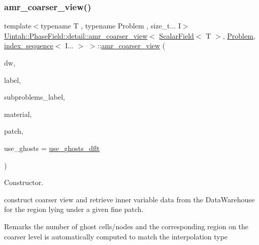 \subsubsection{\texorpdfstring{amr\+\_\+coarser\+\_\+view()}{amr\_coarser\_view()}\hspace{0.1cm}{\footnotesize\ttfamily [3/4]}}
{\footnotesize\ttfamily template$<$typename T , typename Problem , size\+\_\+t... I$>$ \\
\hyperlink{classUintah_1_1PhaseField_1_1detail_1_1amr__coarser__view}{Uintah\+::\+Phase\+Field\+::detail\+::amr\+\_\+coarser\+\_\+view}$<$ \hyperlink{structUintah_1_1PhaseField_1_1ScalarField}{Scalar\+Field}$<$ T $>$, \hyperlink{classUintah_1_1PhaseField_1_1Problem}{Problem}, \hyperlink{namespaceUintah_1_1PhaseField_a237de804d99512e50613aff7c94a9461}{index\+\_\+sequence}$<$ I... $>$ $>$\+::\hyperlink{classUintah_1_1PhaseField_1_1detail_1_1amr__coarser__view}{amr\+\_\+coarser\+\_\+view} (\begin{DoxyParamCaption}\item[{Data\+Warehouse $\ast$}]{dw,  }\item[{const Var\+Label $\ast$}]{label,  }\item[{const Var\+Label $\ast$}]{subproblems\+\_\+label,  }\item[{int}]{material,  }\item[{const Patch $\ast$}]{patch,  }\item[{bool}]{use\+\_\+ghosts = {\ttfamily \hyperlink{classUintah_1_1PhaseField_1_1detail_1_1amr__coarser__view_3_01ScalarField_3_01T_01_4_00_01Proble9cadea116dab5bdb44bb3e29abbe99ef_ace77967592bbb525ac1e29555bb317cd}{use\+\_\+ghosts\+\_\+dflt}} }\end{DoxyParamCaption})\hspace{0.3cm}{\ttfamily [inline]}}



Constructor. 

construct coarser view and retrieve inner variable data from the Data\+Warehouse for the region lying under a given fine patch.

\begin{DoxyRemark}{Remarks}
the number of ghost cells/nodes and the corresponding region on the coarser level is automatically computed to match the interpolation type
\end{DoxyRemark}

